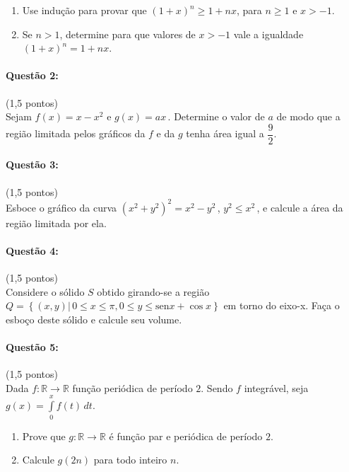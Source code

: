 \documentclass[12pt,a4paper]{article}
\newcommand{\sen}{\mathrm{sen}}
\begin{document}
\begin{enumerate}[label=(\alph*)]

\item Use indução para provar que $(1+x)^n\geq 1+nx$, para $n\geq 1$ e $x>-1$.

\item Se $n>1$, determine para que valores de $x>-1$ vale a igualdade $(1+x)^n=1+nx$.

\end{enumerate}

\paragraph{Questão 2:}(1,5 pontos)\\
Sejam $f(x)=x-x^2$ e $g(x)=ax\,$. Determine o valor de $a$ de modo que a região limitada pelos gráficos da $f$ e da $g$ tenha área igual a $\dfrac{9}{2}$.

\paragraph{Questão 3:}(1,5 pontos)\\
Esboce o gráfico da curva $(x^2+y^2)^2=x^2-y^2\,$, $y^2\leq x^2\,$, e calcule a área da região limitada por ela.

\paragraph{Questão 4:}(1,5 pontos)\\
Considere o sólido $S$ obtido girando-se a região $Q=\left \{(x,y)\vert \,0\leq x\leq \pi, 0\leq y \leq \sen x+\cos x \right \}$ em torno do eixo-x. Faça o esboço deste sólido e calcule seu volume.

\paragraph{Questão 5:}(1,5 pontos)\\
Dada $f:\mathbb{R}\rightarrow \mathbb{R}$ função periódica de período $2$. Sendo $f$ integrável, seja $g(x)=\displaystyle\int\limits_{0}^{x}f(t)\,dt$.

\begin{enumerate}[label=(\alph*)]

\item Prove que $g:\mathbb{R}\rightarrow \mathbb{R}$ é função par e periódica de período $2$.

\item Calcule $g(2n)$ para todo inteiro $n$.

\end{enumerate}
\end{document}

